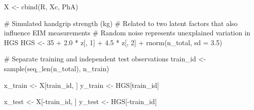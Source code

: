 \documentclass[
  letterpaper,
  DIV=11,
  numbers=noendperiod]{scrreprt}
\newenvironment{Shaded}{\begin{snugshade}}{\end{snugshade}}
\newcommand{\AttributeTok}[1]{\textcolor[rgb]{0.40,0.45,0.13}{#1}}
\newcommand{\CommentTok}[1]{\textcolor[rgb]{0.37,0.37,0.37}{#1}}
\newcommand{\DecValTok}[1]{\textcolor[rgb]{0.68,0.00,0.00}{#1}}
\newcommand{\FloatTok}[1]{\textcolor[rgb]{0.68,0.00,0.00}{#1}}
\newcommand{\FunctionTok}[1]{\textcolor[rgb]{0.28,0.35,0.67}{#1}}
\newcommand{\NormalTok}[1]{\textcolor[rgb]{0.00,0.23,0.31}{#1}}
\newcommand{\OtherTok}[1]{\textcolor[rgb]{0.00,0.23,0.31}{#1}}
\newcommand{\SpecialCharTok}[1]{\textcolor[rgb]{0.37,0.37,0.37}{#1}}
\begin{document}
\begin{Shaded}
\begin{Highlighting}[]
\NormalTok{X }\OtherTok{\textless{}{-}} \FunctionTok{cbind}\NormalTok{(R, Xc, PhA)}

\CommentTok{\# Simulated handgrip strength (kg)}
\CommentTok{\# Related to two latent factors that also influence EIM measurements}
\CommentTok{\# Random noise represents unexplained variation in HGS}
\NormalTok{HGS }\OtherTok{\textless{}{-}} \DecValTok{35} \SpecialCharTok{+}
  \FloatTok{2.0} \SpecialCharTok{*}\NormalTok{ z[, }\DecValTok{1}\NormalTok{] }\SpecialCharTok{+}
  \FloatTok{4.5} \SpecialCharTok{*}\NormalTok{ z[, }\DecValTok{2}\NormalTok{] }\SpecialCharTok{+}
  \FunctionTok{rnorm}\NormalTok{(n\_total, }\AttributeTok{sd =} \FloatTok{3.5}\NormalTok{)}

\CommentTok{\# Separate training and independent test observations}
\NormalTok{train\_id }\OtherTok{\textless{}{-}} \FunctionTok{sample}\NormalTok{(}\FunctionTok{seq\_len}\NormalTok{(n\_total), n\_train)}

\NormalTok{x\_train }\OtherTok{\textless{}{-}}\NormalTok{ X[train\_id, ]}
\NormalTok{y\_train }\OtherTok{\textless{}{-}}\NormalTok{ HGS[train\_id]}

\NormalTok{x\_test }\OtherTok{\textless{}{-}}\NormalTok{ X[}\SpecialCharTok{{-}}\NormalTok{train\_id, ]}
\NormalTok{y\_test }\OtherTok{\textless{}{-}}\NormalTok{ HGS[}\SpecialCharTok{{-}}\NormalTok{train\_id]}


\end{Highlighting}
\end{Shaded}
\end{document}
